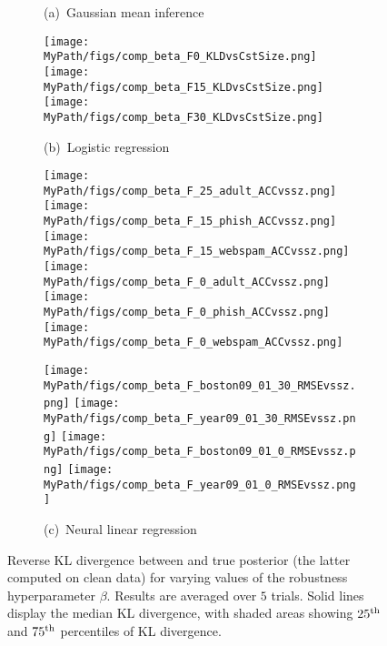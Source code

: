 \begin{figure}[!tp]
	\begin{subfigure}[]{0.995\textwidth} 
		\centering
		\caption{(a)~Gaussian mean inference}
		\centering
		\texttt{[image: \\MyPath/figs/comp\_beta\_F0\_KLDvsCstSize.png]}
		\centering
		\hfill
		\texttt{[image: \\MyPath/figs/comp\_beta\_F15\_KLDvsCstSize.png]}
		\centering
		\hfill
		\texttt{[image: \\MyPath/figs/comp\_beta\_F30\_KLDvsCstSize.png]}
		\centering
		\caption{(b)~Logistic regression}
		\centering 
		\hfill
		\texttt{[image: \\MyPath/figs/comp\_beta\_F\_25\_adult\_ACCvssz.png]}
		\centering
		\hfil
		\texttt{[image: \\MyPath/figs/comp\_beta\_F\_15\_phish\_ACCvssz.png]}
		\centering
		\hfill
		\texttt{[image: \\MyPath/figs/comp\_beta\_F\_15\_webspam\_ACCvssz.png]}
		\centering
		\texttt{[image: \\MyPath/figs/comp\_beta\_F\_0\_adult\_ACCvssz.png]}
		\centering
		\hfill
		\texttt{[image: \\MyPath/figs/comp\_beta\_F\_0\_phish\_ACCvssz.png]}
		\centering
		\hfill
		\texttt{[image: \\MyPath/figs/comp\_beta\_F\_0\_webspam\_ACCvssz.png]}
		\centering
		\caption{(c)~Neural linear regression}
		\centering
		\texttt{[image: \\MyPath/figs/comp\_beta\_F\_boston09\_01\_30\_RMSEvssz.png]}
		\centering
		\texttt{[image: \\MyPath/figs/comp\_beta\_F\_year09\_01\_30\_RMSEvssz.png]}
		\centering
		\texttt{[image: \\MyPath/figs/comp\_beta\_F\_boston09\_01\_0\_RMSEvssz.png]}
		\centering
		\texttt{[image: \\MyPath/figs/comp\_beta\_F\_year09\_01\_0\_RMSEvssz.png]}
	\end{subfigure}	
	\centering
	\caption{Reverse KL divergence between \bcores{} and true posterior (the latter computed on clean data) for varying values of the robustness hyperparameter $\beta$. Results are averaged over $5$ trials. Solid lines display the median KL divergence, with shaded areas showing $25\textsuperscript{th}$ and $75\textsuperscript{th}$ percentiles of KL divergence.}
	\label{fig:beta_sens}
\end{figure}
